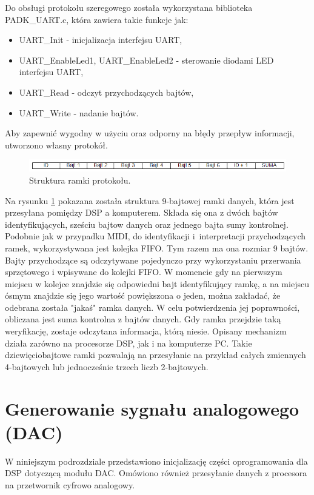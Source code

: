 Do obsługi protokołu szeregowego została wykorzystana biblioteka PADK\_UART.c, która zawiera takie funkcje jak:
\begin{itemize}
	\item UART\_Init - inicjalizacja interfejsu UART,
	\item UART\_EnableLed1, UART\_EnableLed2 - sterowanie diodami LED interfejsu UART,
	\item UART\_Read - odczyt przychodzących bajtów,
	\item UART\_Write - nadanie bajtów.
\end{itemize}
Aby zapewnić wygodny w użyciu oraz odporny na błędy przepływ informacji, utworzono własny protokół.
\begin{figure}[H]
	\centering
	\includegraphics[width=16cm]{./grafiki/real_uartframe}
	\captionsetup{justification=centering}
	\caption{Struktura ramki protokołu.}
	\label{rys:real_uartframe}
\end{figure}
Na rysunku \ref{rys:real_uartframe} pokazana została struktura 9-bajtowej ramki danych, która jest przesyłana pomiędzy DSP a komputerem. Składa się ona z dwóch bajtów identyfikujących, sześciu bajtow danych oraz jednego bajta sumy kontrolnej. Podobnie jak w przypadku MIDI, do identyfikacji i~interpretacji przychodzących ramek, wykorzystywana jest kolejka FIFO. Tym razem ma ona rozmiar 9 bajtów. Bajty przychodzące są odczytywane pojedynczo przy wykorzystaniu przerwania sprzętowego i wpisywane do kolejki FIFO. W momencie gdy na pierwszym miejscu w kolejce znajdzie się odpowiedni bajt identyfikujący ramkę, a na miejscu ósmym znajdzie się jego wartość powiększona o jeden, można zakładać, że odebrana została "jakaś" ramka danych. W celu potwierdzenia jej poprawności, obliczana jest suma kontrolna z bajtów danych. Gdy ramka przejdzie taką weryfikację, zostaje odczytana informacja, którą niesie. Opisany mechanizm działa zarówno na procesorze DSP, jak i na komputerze PC.
Takie dziewięciobajtowe ramki pozwalają na przesyłanie na przykład całych zmiennych 4-bajtowych lub jednocześnie trzech liczb 2-bajtowych. 



\section{Generowanie sygnału analogowego (DAC)}
W niniejszym podrozdziale przedstawiono inicjalizację części oprogramowania dla DSP dotyczącą modułu DAC. Omówiono również przesyłanie danych z procesora na przetwornik cyfrowo analogowy.

